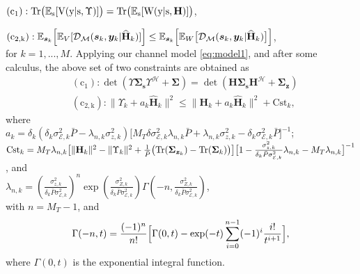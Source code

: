 \documentclass{article}
\def\H{{\mathbf H}}
\def\HH{\widehat{{\mathbf H}}}
\def\tg{\mathcal{H}}
\def\y{{\bm y }}
\def\s{{\bm s }}
\def\z{{\bm z }}
\def\sig{\mathbf \Sigma}
\newcommand{\mc}{\mathcal}
\begin{document}
$({\rm c_{1}}):\rm{Tr}\big(\mathbb{E}_{\s}[V(\y|\s,\Upsilon)]\big)=\rm{Tr} \big(\mathbb{E}_{\s}[W(\y|\s,\H)]\big)$, \vspace{2mm}

$({\rm c_{2,k}}): \mathbb{E}_{\s_k} \Big [\mathbb{E}_{V}[\mathcal{D}_\mc{M}(\s_k,\y_k|\HH_k)] \Big] \leq \\
\mathbb{E}_{\s_k} \Big[\mathbb{E}_{W} \big[\mathcal{D}_\mc{M}(\s_k,\y_k|\HH_k)\big]\Big]$,
\\
for $k=1,...,M$.
Applying our channel model \eqref{eq:model1}, and after some calculus, the above set of two constraints are obtained as \begin{align}
&\mathrm{(c_{1})}: \det \left(\Upsilon \sig_\s \Upsilon^\tg + \sig \right)=\det\left(\H \sig_\s \H^\tg + \sig_{\z}\right) \label{c1}\\
&\mathrm{(c_{2,k})}: \| \Upsilon_k + a_k \widehat{\H}_k \|^2\leq  \| \H_k +a_k \widehat{\H}_k \|^2 + \textrm{Cst}_k,\label{c2}
\end{align}
where
\\
$a_k=\delta_k(\delta_k \sigma^2_{\mathcal{E},k} \bar{P} - \lambda_{n,k} \sigma_{z,k}^2)\big[M_T\delta\sigma^2_{\mc{E},k}\lambda_{n,k} \bar{P} +\lambda_{n,k} \sigma_{z,k}^2- \delta_k \sigma^2_{\mathcal{E},k} \bar{P} \big]^{-1}$;\vspace{2mm}
$\textrm{Cst}_k = M_T \lambda_{n,k} \big[\|\H_k \|^2-\| \Upsilon_k\|^2 + \frac{1}{\bar{P}}\big({\rm Tr}(\sig_{\z_k})-{\rm Tr}(\sig_k)\big)\big] \big[1-\frac{\sigma_{z,k}^2}{\delta_k \bar{P}\sigma^2_{\mathcal{E},k}}\lambda_{n,k}-M_T \lambda_{n,k} \big]^{-1}$,
and \vspace{2mm}
\\
$\lambda_{n,k}=\left(\frac{ \sigma_{z,k}^2}{\delta_k \bar{P}\sigma^2_{\mathcal{E},k} }\right)^n\exp\left(\frac{ \sigma_{Z,k}^2}{\delta_k \bar{P} \sigma^2_{\mathcal{E},k} }\right)\Gamma\left(-n,\frac{ \sigma_{Z,k}^2}{\delta_k \bar{P} \sigma^2_{\mathcal{E},k}}\right)$,
\\
with $n=M_T-1$, and
\begin{equation*}
\Gamma (-n,t)=\frac{(-1)^n}{n !} \Big[\Gamma (0,t)-\exp(-t)\sum\limits_{i=0}^{n-1}(-1)^i \frac{i !}{t^{i+1}} \Big], \vspace{-1mm}
\end{equation*}
where $\Gamma (0,t)$ is the exponential integral function.
\end{document}
